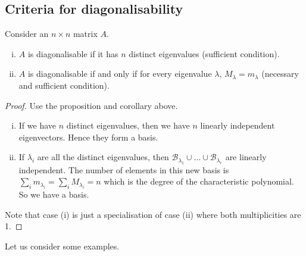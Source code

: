 \subsection{Criteria for diagonalisability}
\begin{proposition}
	Consider an \(n \times n\) matrix \(A\).
	\begin{enumerate}[(i)]
		\item \(A\) is diagonalisable if it has \(n\) distinct eigenvalues (sufficient condition).
		\item \(A\) is diagonalisable if and only if for every eigenvalue \(\lambda\), \(M_\lambda = m_\lambda\) (necessary and sufficient condition).
	\end{enumerate}
\end{proposition}
\begin{proof}
	Use the proposition and corollary above.
	\begin{enumerate}[(i)]
		\item If we have \(n\) distinct eigenvalues, then we have \(n\) linearly independent eigenvectors.
		      Hence they form a basis.
		\item If \(\lambda_i\) are all the distinct eigenvalues, then \(\mathcal B_{\lambda_1} \cup \dots \cup \mathcal B_{\lambda_r}\) are linearly independent.
		      The number of elements in this new basis is \(\sum_{i} m_{\lambda_i} = \sum_{i} M_{\lambda_i} = n\) which is the degree of the characteristic polynomial.
		      So we have a basis.
	\end{enumerate}
	Note that case (i) is just a specialisation of case (ii) where both multiplicities are 1.
\end{proof}
Let us consider some examples.
